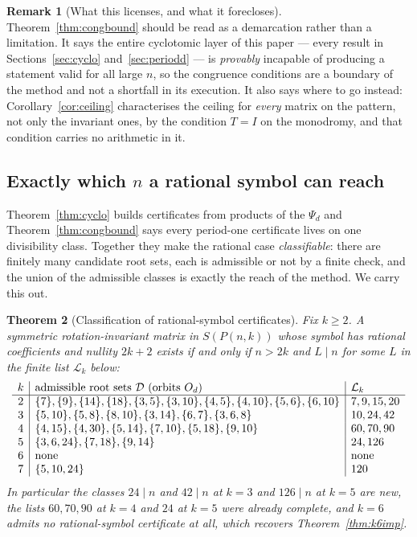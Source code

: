 \documentclass[11pt]{article}
\newtheorem{theorem}{Theorem}
\theoremstyle{definition}
\newtheorem{remark}[theorem]{Remark}
\begin{document}
\begin{remark}[What this licenses, and what it forecloses]
Theorem~\ref{thm:congbound} should be read as a demarcation rather than a
limitation. It says the entire cyclotomic layer of this paper --- every result
in Sections~\ref{sec:cyclo} and~\ref{sec:periodd} --- is \emph{provably}
incapable of producing a statement valid for all large $n$, so the congruence
conditions are a boundary of the method and not a shortfall in its execution.
It also says where to go instead: Corollary~\ref{cor:ceiling} characterises the
ceiling for \emph{every} matrix on the pattern, not only the invariant ones, by
the condition $T=I$ on the monodromy, and that condition carries no arithmetic
in it.
\end{remark}

\subsection*{Exactly which $n$ a rational symbol can reach}
Theorem~\ref{thm:cyclo} builds certificates from products of the $\Psi_d$ and
Theorem~\ref{thm:congbound} says every period-one certificate lives on one
divisibility class. Together they make the rational case \emph{classifiable}:
there are finitely many candidate root sets, each is admissible or not by a
finite check, and the union of the admissible classes is exactly the reach of
the method. We carry this out.

\begin{theorem}[Classification of rational-symbol certificates]\label{thm:ratclass}
Fix $k\ge2$. A symmetric rotation-invariant matrix in $S(P(n,k))$ whose symbol
has rational coefficients and nullity $2k+2$ exists if and only if $n>2k$ and
$L\mid n$ for some $L$ in the finite list $\mathcal L_k$ below:
\[
\begin{array}{c|l|l}
 k & \text{admissible root sets } \mathcal D\ (\text{orbits }O_d) & \mathcal L_k\\\hline
 2 & \{7\},\{9\},\{14\},\{18\},\{3,5\},\{3,10\},\{4,5\},\{4,10\},\{5,6\},\{6,10\} & 7,9,15,20\\
 3 & \{5,10\},\{5,8\},\{8,10\},\{3,14\},\{6,7\},\{3,6,8\} & 10,24,42\\
 4 & \{4,15\},\{4,30\},\{5,14\},\{7,10\},\{5,18\},\{9,10\} & 60,70,90\\
 5 & \{3,6,24\},\{7,18\},\{9,14\} & 24,126\\
 6 & \text{none} & \text{none}\\
 7 & \{5,10,24\} & 120
\end{array}
\]
In particular the classes $24\mid n$ and $42\mid n$ at $k=3$ and $126\mid n$ at
$k=5$ are new, the lists $60,70,90$ at $k=4$ and $24$ at $k=5$ were already
complete, and $k=6$ admits no rational-symbol certificate at all, which
recovers Theorem~\ref{thm:k6imp}.
\end{theorem}
\end{document}
